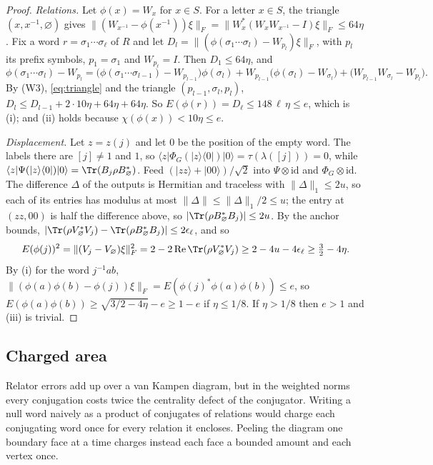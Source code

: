\begin{proof}
\emph{Relations.} Let $\phi(x)=W_x$ for $x\in S$. For a letter $x\in S$, the triangle $(x,x^{-1},\varnothing)$ gives
$\|(W_{x^{-1}}-\phi(x^{-1}))\xi\|_F=\|W_x^*(W_xW_{x^{-1}}-I)\xi\|_F\le64\eta$. Fix a word $r=\sigma_1\cdots\sigma_\ell$ of $R$ and let
$D_l=\|(\phi(\sigma_1\cdots\sigma_l)-W_{p_l})\xi\|_F$, with $p_l$ its prefix symbols, $p_1=\sigma_1$ and $W_{p_\ell}=I$. Then $D_1\le64\eta$, and
\[
\phi(\sigma_1\cdots\sigma_l)-W_{p_l}=\bigl(\phi(\sigma_1\cdots\sigma_{l-1})-W_{p_{l-1}}\bigr)\phi(\sigma_l)+W_{p_{l-1}}\bigl(\phi(\sigma_l)-W_{\sigma_l}\bigr)+\bigl(W_{p_{l-1}}W_{\sigma_l}-W_{p_l}\bigr).
\]
By (W3), \eqref{eq:triangle} and the triangle $(p_{l-1},\sigma_l,p_l)$, $D_l\le D_{l-1}+2\cdot10\eta+64\eta+64\eta$. So
$E(\phi(r))=D_\ell\le148\,\ell\,\eta\le e$, which is (i); and (ii) holds because $\chi(\phi(x))<10\eta\le e$.

\emph{Displacement.} Let $z=z(j)$ and let $0$ be the position of the empty word. The labels there are $[j]\ne1$ and $1$, so
$\langle z|\Phi_G(|z\rangle\langle0|)|0\rangle=\tau(\lambda([j]))=0$, while $\langle z|\Psi(|z\rangle\langle0|)|0\rangle=\Tr(B_j\rho B_\varnothing^*)$. Feed
$(|zz\rangle+|00\rangle)/\sqrt2$ into $\Psi\otimes\mathrm{id}$ and $\Phi_G\otimes\mathrm{id}$. The difference $\Delta$ of the outputs is Hermitian and traceless with
$\|\Delta\|_1\le2u$, so each of its entries has modulus at most $\|\Delta\|\le\|\Delta\|_1/2\le u$; the entry at $(zz,00)$ is half the difference
above, so $|\Tr(\rho B_\varnothing^*B_j)|\le2u$. By the anchor bounds, $|\Tr(\rho V_\varnothing^*V_j)-\Tr(\rho B_\varnothing^*B_j)|\le2\epsilon_\ell$, and so
\[
E(\phi(j))^2=\|(V_j-V_\varnothing)\xi\|_F^2=2-2\,\mathrm{Re}\,\Tr(\rho V_\varnothing^*V_j)\ge2-4u-4\epsilon_\ell\ge\tfrac32-4\eta .
\]
By (i) for the word $j^{-1}ab$, $\|(\phi(a)\phi(b)-\phi(j))\xi\|_F=E(\phi(j)^*\phi(a)\phi(b))\le e$, so $E(\phi(a)\phi(b))\ge\sqrt{3/2-4\eta}-e\ge1-e$ if
$\eta\le1/8$. If $\eta>1/8$ then $e>1$ and (iii) is trivial.
\end{proof}

\subsection{Charged area}

Relator errors add up over a van Kampen diagram, but in the weighted norms every conjugation costs twice the centrality defect of the
conjugator. Writing a null word naively as a product of conjugates of relations would charge each conjugating word once for every relation it
encloses. Peeling the diagram one boundary face at a time charges instead each face a bounded amount and each vertex once.


